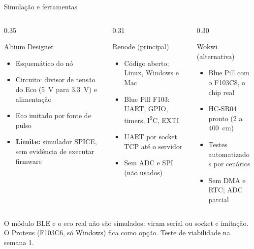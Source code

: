 \documentclass[aspectratio=169,11pt]{beamer}
\begin{document}
\begin{frame}[t]{Simulação e ferramentas}
  \begin{columns}[T]
    \begin{column}{0.35\textwidth}
      \begin{block}{Altium Designer}
        \footnotesize\raggedright
        \begin{itemize}
          \item Esquemático do nó
          \item Circuito: divisor de tensão do Eco (5~V para 3,3~V) e alimentação
          \item Eco imitado por fonte de pulso
          \item \textbf{Limite:} simulador SPICE, sem evidência de executar firmware
        \end{itemize}
      \end{block}
    \end{column}
    \begin{column}{0.31\textwidth}
      \begin{block}{Renode (principal)}
        \footnotesize\raggedright
        \begin{itemize}
          \item Código aberto; Linux, Windows e Mac
          \item Blue Pill F103: UART, GPIO, timers, I\textsuperscript{2}C, EXTI
          \item UART por socket TCP até o servidor
          \item Sem ADC e SPI (não usados)
        \end{itemize}
      \end{block}
    \end{column}
    \begin{column}{0.30\textwidth}
      \begin{block}{Wokwi (alternativa)}
        \footnotesize\raggedright
        \begin{itemize}
          \item Blue Pill com o F103C8, o chip real
          \item HC-SR04 pronto (2 a 400~cm)
          \item Testes automatizados por cenários
          \item Sem DMA e RTC; ADC parcial
        \end{itemize}
      \end{block}
    \end{column}
  \end{columns}
  \vfill
  {\scriptsize O módulo BLE e o eco real não são simulados: viram serial ou socket e imitação. O Proteus (F103C6, só Windows) fica como opção. Teste de viabilidade na semana 1.\par}
\end{frame}
\end{document}
